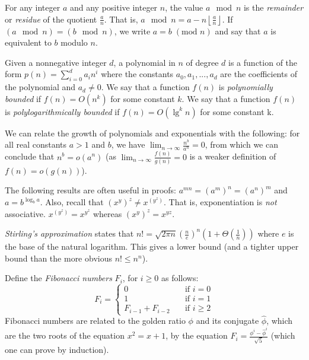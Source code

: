 \documentclass[12pt]{article}
\begin{document}
For any integer $a$ and any positive integer $n$, the value $a\mod n$ is the \textit{remainder} or
\textit{residue} of the quotient $\frac{a}{n}$. That is, $a \mod n = a - n\left\lfloor\frac{a}{n}\right\rfloor$.
If $(a\mod n) = (b\mod n)$, we write $a = b \;(\text{mod } n)$ and say that $a$ is equivalent to $b$ modulo $n$.

Given a nonnegative integer $d$, a polynomial in $n$ of degree $d$ is a function of the form $p(n) = \sum_{i = 0}^{d}a_in^i$
where the constants $a_0, a_1, ..., a_d$ are the coefficients of the polynomial and $a_d \neq 0$. We say that
a function $f(n)$ is \textit{polynomially bounded} if $f(n) = O(n^k)$ for some constant $k$. We say that a function $f(n)$
is \textit{polylogarithmically bounded} if $f(n) = O(\lg^kn)$ for some constant k.

We can relate the growth of polynomials and exponentials with the following: for all real constants $a > 1$ and $b$, we have
$\displaystyle \lim_{n\to\infty}\frac{n^b}{a^n} = 0$, from which we can conclude that $n^b = o(a^n)$
(as $\displaystyle\lim_{n\to\infty}\frac{f(n)}{g(n)} = 0$ is a weaker definition of $f(n) = o(g(n))$).

The following results are often useful in proofs: $a^{mn} = (a^m)^n = (a^n)^m$ and $a = b^{\log_{b}a}$. Also, recall
that ${(x^y)}^z \neq x^{(y^z)}$. That is, exponentiation is \textit{not} associative. $x^{(y^z)} = x^{y^z}$ whereas
$(x^y)^z = x^{yz}$.

\textit{Stirling's approximation} states that $n! = \sqrt{2\pi n}\left(\frac{n}{e}\right)^n(1 + \Theta\left(\frac{1}{n}\right))$
where $e$ is the base of the natural logarithm. This gives a lower bound (and a tighter upper bound than the
more obvious $n! \leq n^n$).

Define the \textit{Fibonacci numbers} $F_i$, for $i \geq 0$ as follows:
\[ F_i =
  \begin{cases}
    0 & \quad \text{if } i = 0\\
    1 & \quad \text{if } i = 1\\
    F_{i - 1} + F_{i - 2} & \quad \text{if } i \geq 2
  \end{cases}
\]
Fibonacci numbers are related to the golden ratio $\phi$ and its conjugate $\hat{\phi}$, which are
the two roots of the equation $x^2= x + 1$, by the equation $F_i= \frac{\phi^i - \hat{\phi}^i}{\sqrt{5}}$ (which
one can prove by induction).
\end{document}

